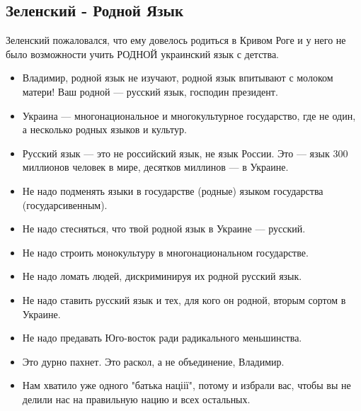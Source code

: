  
 
 

\subsection{Зеленский - Родной Язык}
\label{sec:09_11_2020.fb.skubchenco.1.zelja_mova}

Зеленский пожаловался, что ему довелось родиться в Кривом Роге и у него не было возможности учить РОДНОЙ украинский язык с детства. 

\begin{itemize}
  \item Владимир, родной язык не изучают, родной язык впитывают с молоком матери! Ваш родной --- русский язык, господин президент. 
  \item Украина --- многонациональное и многокультурное государство, где не один, а несколько родных языков и культур. 
  \item Русский язык --- это не российский язык, не язык России. Это --- язык 300 миллионов человек в мире, десятков миллинов --- в Украине. 
  \item Не надо подменять языки в государстве (родные) языком государства (государсивенным). 
  \item Не надо стесняться, что твой родной язык в Украине --- русский. 
  \item Не надо строить монокультуру в многонациональном государстве. 
  \item Не надо ломать людей, дискриминируя их родной русский язык. 
  \item Не надо ставить русский язык и тех, для кого он родной, вторым сортом в Украине. 
  \item Не надо предавать Юго-восток ради радикального меньшинства.
  \item Это дурно пахнет. Это раскол, а не объединение, Владимир. 
  \item Нам хватило уже одного "батька націії", потому и избрали вас, чтобы вы не делили нас на правильную нацию и всех остальных.
\end{itemize}
